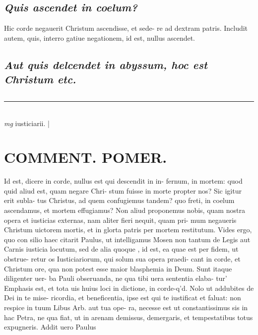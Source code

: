 \documentclass{article}
\begin{document}
\begin{pages}
\subsection*{\textit{Quis ascendet in coelum? }}\pstart Hic corde negauerit Christum ascendisse, et sede- re ad dextram patris. Includit autem, quis, interro gatiue negationem, id est, nullus ascendet.   \pend
{}
{}
\subsection*{\textit{Aut quis delcendet in abyssum, hoc est Christum etc. }}
{}
\subsection*{\textit{}}\pstart  \pend
\vspace{0.5cm}\noindent
\vspace{0.2cm}\rule{1cm}{0.2pt}\\ 
\hspace{0.2cm}\textit{mg}
\footnotesize iusticiarii.  
\normalsize| 
\section*{COMMENT. POMER.  }\pstart Id est, dicere in corde, nullus est qui descendit in in- fernum, in mortem: quod quid aliud est, quam negare Chri- stum fuisse in morte propter nos? Sic igitur erit subla- tus Christus, ad quem confugiemus tandem? quo freti, in coelum ascendamus, et mortem effugiamus? Non aliud proponemus nobis, quam nostra opera et iusticias externas, nam aliter fieri nequit, quam pri- mum negaueris Christum uictorem mortis, et in glorta patris per mortem restitutum. Vides ergo, quo con silio haec citarit Paulus, ut intelligamus Mosen non tantum de Legis aut Carnis iusticia locutum, sed de alia quoque , id est, ea quae est per fidem, ut obstrue- retur os Iusticiariorum, qui solum sua opera praedi- cant in corde, et Christum ore, qua non potest esse maior blasphemia in Deum. Sunt itaque diligenter uer- ba Pauli obseruanda, ne qua tibi uera sententia elaba- tur' Emphasis est, et tota uis huius loci in dictione, in corde-q'd. Nolo ut addubites de Dei in te mise- ricordia, et beneficentia, ipse est qui te iustificat et faluat: non respice in tuum Libus Arb. aut tua ope- ra, necesse est ut constantissimus sis in hac Petra, ne qua fiat, ut in arenam demissus, demergaris, et tempestatibus totus expugneris. Addit uero Paulus  \pend
{}
{}

\end{pages}
\end{document}
